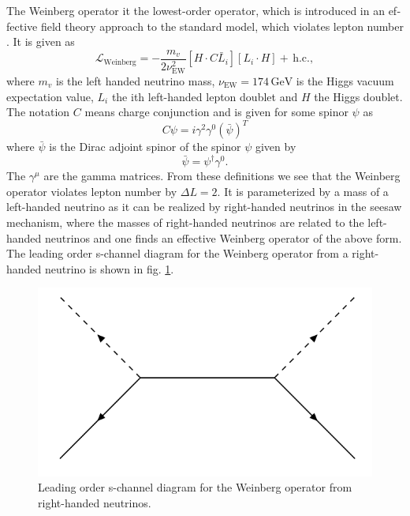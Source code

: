 \documentclass[master,       %
               twoside,        %
               BCOR10mm,       %
               english,ngerman, %
               ]{GAUBM}
\begin{document}
\begin{otherlanguage}{english}
The Weinberg operator it the lowest-order operator, which is introduced in an effective field theory approach to the standard model, which violates lepton number \cite[sec. 5]{Domcke:2020kcp_Generic_Couplings}.
It is given as
\begin{equation}
	\mathcal{L}_\mathrm{Weinberg} = - \frac{m_v}{2 \nu_\mathrm{EW}^2} [H \cdot C \bar{L}_i] [L_i \cdot H]+ \, \mathrm{h.c.},
\end{equation}
where $m_v$ is the left handed neutrino mass, $\nu_\mathrm{EW} = 174 \, \mathrm{GeV}$ is the Higgs vacuum expectation value,
$L_i$ the ith left-handed lepton doublet and $H$ the Higgs doublet.
The notation $C$ means charge conjunction and is given for some spinor $\psi$ as
\begin{equation}
	C \psi = i \gamma^2 \gamma^0 (\bar{\psi})^T
\end{equation}
where $\bar{\psi}$ is the Dirac adjoint spinor of the spinor $\psi$ given by
\begin{equation}
	\bar{\psi} = \psi^\dagger \gamma^0.
\end{equation}
The $\gamma^\mu$ are the gamma matrices.
From these definitions we see that the Weinberg operator violates lepton number by $\Delta L = 2$.
It is parameterized by a mass of a left-handed neutrino as it can be realized by right-handed neutrinos in the seesaw mechanism, where the masses of right-handed neutrinos are related to the left-handed neutrinos and one finds an effective Weinberg operator of the above form.
The leading order s-channel diagram for the Weinberg operator from a right-handed neutrino is shown in fig. \ref{fig:weinberg}.

\begin{figure}[H]
	\centering
	\includegraphics[width=0.5\linewidth]{figures/weinberg_operator_from_rh_neutrino.png}
	\caption{Leading order s-channel diagram for the Weinberg operator from right-handed neutrinos.}
	\label{fig:weinberg}
\end{figure}



\end{otherlanguage}
\end{document}
